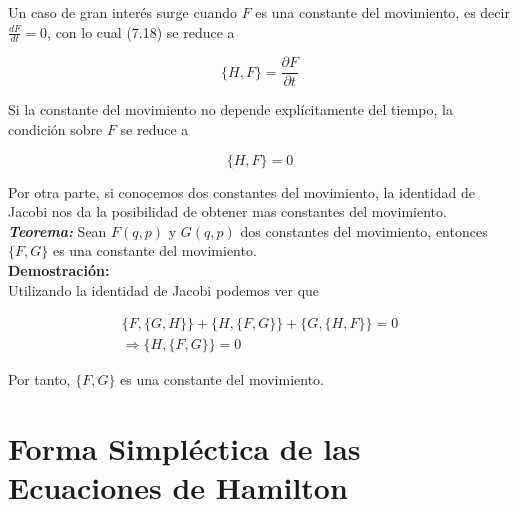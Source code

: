 \documentclass[12pt]{report}
\begin{document}
Un caso de gran interés surge cuando $F$ es una constante del movimiento, es decir $\displaystyle \frac{dF}{dt}=0$, con lo cual (7.18) se reduce a 



\begin{equation}
\{H,F\}=\frac{\partial F}{\partial t}
\end{equation}

Si la constante del movimiento no depende explícitamente del tiempo, la condición sobre $F$ se reduce a

\begin{equation}
\{H,F\} = 0
\end{equation} 

Por otra parte, si conocemos dos constantes del movimiento, la identidad de Jacobi nos da la posibilidad de obtener mas constantes del movimiento. \\


\textbf{\textit{Teorema:}}  Sean $F(q,p)$ y $G(q,p)$ dos constantes del movimiento, entonces $\{F,G\}$ es una constante del movimiento. \\

\textbf{Demostración:} \\

Utilizando la identidad de Jacobi podemos ver que 

\begin{eqnarray}
\{F,\{G,H\}\}+ \{H,\{F,G\}\} + \{G,\{H,F\}\}=0 \\
\Rightarrow \{H,\{F,G\}\} = 0
\end{eqnarray}

Por tanto, $\{ F,G \}$ es una constante del movimiento.





















\section{Forma Simpléctica de las Ecuaciones de Hamilton}
\end{document}

